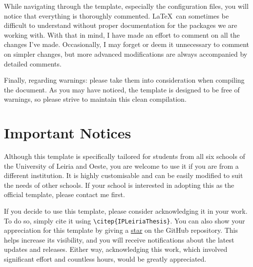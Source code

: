 While navigating through the template, especially the configuration files, you will notice that everything is thoroughly commented. \LaTeX~can sometimes be difficult to understand without proper documentation for the packages we are working with. With that in mind, I have made an effort to comment on all the changes I’ve made. Occasionally, I may forget or deem it unnecessary to comment on simpler changes, but more advanced modifications are always accompanied by detailed comments.

Finally, regarding warnings: please take them into consideration when compiling the document. As you may have noticed, the template is designed to be free of warnings, so please strive to maintain this clean compilation.

\section{Important Notices}
Although this template is specifically tailored for students from all six schools of the University of Leiria and Oeste, you are welcome to use it if you are from a different institution. It is highly customisable and can be easily modified to suit the needs of other schools. If your school is interested in adopting this as the official template, please contact me first.

If you decide to use this template, please consider acknowledging it in your work. To do so, simply cite it using \verb|\citep{IPLeiriaThesis}|. You can also show your appreciation for this template by giving a \href{https://github.com/joseareia/ipleiria-thesis/stargazers}{star} on the GitHub repository. This helps increase its visibility, and you will receive notifications about the latest updates and releases. Either way, acknowledging this work, which involved significant effort and countless hours, would be greatly appreciated.

